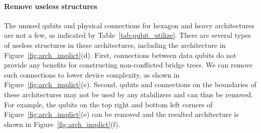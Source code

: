 \paragraph{Remove useless structures}
The unused qubits and physical connections for hexagon and heavy architectures are not a few, as indicated by Table~\ref{tab:qubit_utilize}. 
There are several types of useless structures in these architectures, including the architecture in Figure~\ref{fig:arch_implict}(d). {First}, connections between data qubits do not provide any benefits for constructing non-conflicted bridge trees. We can remove such connections to lower device complexity, as shown in Figure~\ref{fig:arch_implict}(e).
{Second}, 
qubits and connections on the boundaries of these architectures may not be used by any stabilizers and can thus be removed. For example, the qubits on the top right and bottom left corners of Figure~\ref{fig:arch_implict}(e) can be removed and the resulted architecture is shown in Figure~\ref{fig:arch_implict}(f).